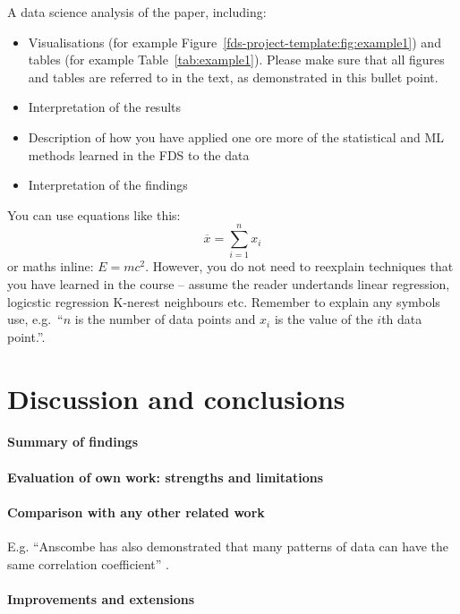 \documentclass[11pt,a4paper]{article}
\begin{document}
A data science analysis of the paper, including: 
\begin{itemize}
\item Visualisations (for example
  Figure~\ref{fds-project-template:fig:example1}) and tables (for
  example Table~\ref{tab:example1}). Please make sure that all figures
  and tables are referred to in the text, as demonstrated in this
  bullet point.
\item Interpretation of the results 
\item Description of how you have applied one ore more of the
  statistical and ML methods learned in the FDS to the data
\item Interpretation of the findings 
\end{itemize}

You can use equations like this:
\begin{equation}
  \label{fds-project-template:eq:1}
  \overline{x} = \sum_{i=1}^n x_i
\end{equation}
or maths inline: $E=mc^2$. However, you do not need to reexplain techniques that you have learned in the course -- assume the reader undertands linear regression, logicstic regression K-nerest neighbours etc.  Remember to explain any symbols use, e.g.~``$n$ is the number of data points and $x_i$ is the value of the $i$th data point.''.

\section{Discussion and conclusions}

\paragraph{Summary of findings}

\paragraph{Evaluation of own work: strengths and limitations}

\paragraph{Comparison with any other related work}
E.g. ``Anscombe has also demonstrated that many patterns of data can
have the same correlation coefficient'' \cite{Ansc73Grap}.

\paragraph{Improvements and extensions}



\end{document}

